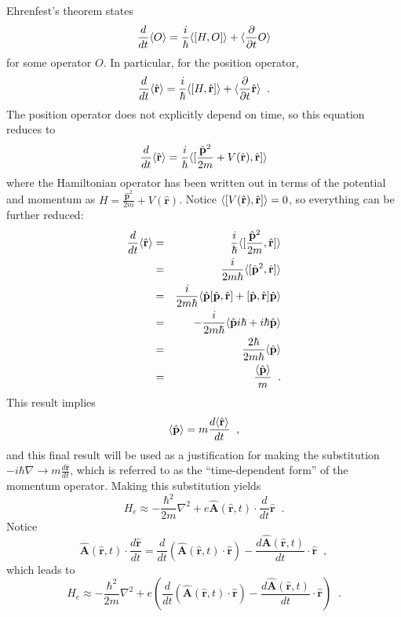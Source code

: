 Ehrenfest's theorem \cite{Schwabl2007} states 
$$
\frac{d}{dt}\langle O\rangle = \frac{i}{\hbar}\langle [H,O]\rangle+\langle \frac{\partial }{\partial t}O\rangle
$$ for some operator $O$.  In particular, for the position operator, 
$$
\frac{d}{dt}\langle \hat{\mathbf{r}}\rangle = \frac{i}{\hbar}\langle [H,\hat{\mathbf{r}}]\rangle+\langle \frac{\partial }{\partial t}\hat{\mathbf{r}}\rangle\;\;.
$$  
The position operator does not explicitly depend on time, so this equation reduces to 
$$
\frac{d}{dt}\langle \hat{\mathbf{r}}\rangle = \frac{i}{\hbar}\langle [\frac{\hat{\mathbf{p}}^2}{2m}+V(\hat{\mathbf{r}}),\hat{\mathbf{r}}]\rangle
$$ 
where the Hamiltonian operator has been written out in terms of the potential and momentum as $H=\frac{\hat{\mathbf{p}}^2}{2m}+V(\hat{\mathbf{r}})$.  Notice $\langle [V(\hat{\mathbf{r}}),\hat{\mathbf{r}}]\rangle=0$, so everything can be further reduced: 
\begin{eqnarray*}
\frac{d}{dt}\langle \hat{\mathbf{r}}\rangle &=& \frac{i}{\hbar}\langle [\frac{\hat{\mathbf{p}}^2}{2m},\hat{\mathbf{r}}]\rangle\\
&=& \frac{i}{2m\hbar}\langle [\hat{\mathbf{p}}^2,\hat{\mathbf{r}}]\rangle\\
&=& \frac{i}{2m\hbar}\langle \hat{\mathbf{p}}[\hat{\mathbf{p}},\hat{\mathbf{r}}]+[\hat{\mathbf{p}},\hat{\mathbf{r}}]\hat{\mathbf{p}}\rangle\\
&=&-\frac{i}{2m\hbar}\langle \hat{\mathbf{p}}i\hbar+i\hbar \hat{\mathbf{p}}\rangle\\
&=& \frac{2\hbar}{2m\hbar}\langle \hat{\mathbf{p}}\rangle\\
&=& \frac{\langle \hat{\mathbf{p}}\rangle}{m}\;\;.
\end{eqnarray*}
This result implies 
$$
\langle \hat{\mathbf{p}}\rangle=m\frac{d\langle \hat{\mathbf{r}}\rangle}{dt}\;\;,
$$
and this final result will be used as a justification for making the substitution $-i\hbar\nabla\rightarrow m\frac{d\hat{\mathbf{r}}}{dt}$, which is referred to as the ``time-dependent form'' of the momentum operator.  Making this substitution yields
$$
H_e \approx -\frac{\hbar^2}{2m}\nabla^2 + e\hat{\mathbf{A}}\left(\hat{\mathbf{r}},t\right)\cdot\frac{d}{dt}\hat{\mathbf{r}}\;\;.
$$
Notice
$$
\hat{\mathbf{A}}(\hat{\mathbf{r}},t)\cdot\frac{d\hat{\mathbf{r}}}{dt} = \frac{d}{dt}\left(\hat{\mathbf{A}}(\hat{\mathbf{r}},t)\cdot\hat{\mathbf{r}}\right)-\frac{d\hat{\mathbf{A}}(\hat{\mathbf{r}},t)}{dt}\cdot\hat{\mathbf{r}} \;\;,
$$
which leads to
$$
H_e \approx -\frac{\hbar^2}{2m}\nabla^2 +e\left(\frac{d}{dt}\left(\hat{\mathbf{A}}(\hat{\mathbf{r}},t)\cdot\hat{\mathbf{r}}\right)-\frac{d\hat{\mathbf{A}}(\hat{\mathbf{r}},t)}{dt}\cdot\hat{\mathbf{r}}\right)\;\;.
$$

